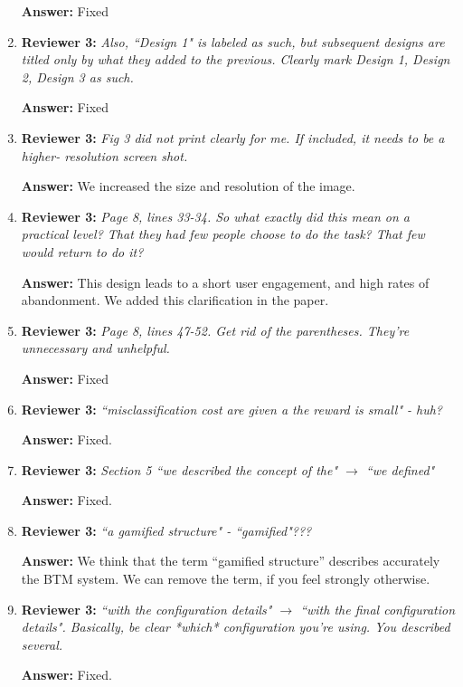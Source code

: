 \documentclass[letterpaper]{article}
\begin{document}
\begin{enumerate}
\textbf{Answer:} Fixed

\item \textbf{Reviewer 3:} \emph{ Also, ``Design 1" is labeled as such, but subsequent designs are titled only by what they added to the previous.  Clearly mark Design 1, Design 2, Design 3 as such.}

\textbf{Answer:} Fixed

\item \textbf{Reviewer 3:} \emph{ Fig 3 did not print clearly for me.  If included, it needs to be a higher- resolution screen shot.}

\textbf{Answer:} We increased the size and resolution of the image.

\item \textbf{Reviewer 3:} \emph{ Page 8, lines 33-34.  So what exactly did this mean on a practical level? That they had few people choose to do the task?  That few would return to do it?}

\textbf{Answer:} This design leads to a short user engagement, and high rates of abandonment. We added this clarification in the paper.

\item \textbf{Reviewer 3:} \emph{ Page 8, lines 47-52.  Get rid of the parentheses.  They're unnecessary and unhelpful.}

\textbf{Answer:} Fixed

\item \textbf{Reviewer 3:} \emph{ ``misclassification cost are given a the reward is small" - huh?}

\textbf{Answer:} Fixed.

\item \textbf{Reviewer 3:} \emph{ Section 5 ``we described the concept of the" $\rightarrow$ ``we defined"}

\textbf{Answer:} Fixed.

\item \textbf{Reviewer 3:} \emph{ ``a gamified structure" - ``gamified"???}

\textbf{Answer:} We think that the term ``gamified structure'' describes accurately the BTM system. We can remove the term, if you feel strongly otherwise.

\item \textbf{Reviewer 3:} \emph{ ``with the configuration details" $\rightarrow$ ``with the final configuration details". Basically, be clear *which* configuration you're using.  You described several.}

\textbf{Answer:} Fixed.


\end{enumerate}
\end{document}
